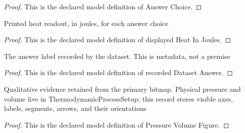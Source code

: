 \begin{proof}
  This is the declared model definition of Answer Choice.
\end{proof}
\begin{definition}
  \label{def:physics:phyx-mini-0341:phyxminiproblems-problemphyxmini0341-displayedheatinjoules}
  Printed heat readout, in joules, for each answer choice
\end{definition}
\begin{proof}
  This is the declared model definition of displayed Heat In Joules.
\end{proof}
\begin{definition}
  \label{def:physics:phyx-mini-0341:phyxminiproblems-problemphyxmini0341-recordeddatasetanswer}
  The answer label recorded by the dataset. This is metadata, not a premise
\end{definition}
\begin{proof}
  This is the declared model definition of recorded Dataset Answer.
\end{proof}
\begin{definition}
  \label{def:physics:phyx-mini-0341:phyxminiproblems-problemphyxmini0341-pressurevolumefigure}
  Qualitative evidence retained from the primary bitmap. Physical pressure and volume live in ThermodynamicProcessSetup; this record stores visible axes, labels, segments, arrows, and their orientations
\end{definition}
\begin{proof}
  This is the declared model definition of Pressure Volume Figure.
\end{proof}
